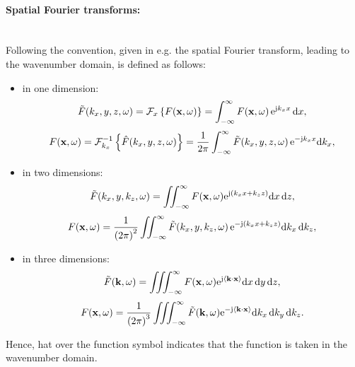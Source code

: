\paragraph{Spatial Fourier transforms:}\mbox{} \\
Following the convention, given in e.g. \cite{Ahrens2012} the spatial Fourier transform, leading to the wavenumber domain, is defined as follows:
\begin{itemize}
\item in one dimension:
\begin{equation}
\label{eq:spatial_fourier_transform_def}
\tilde{F}(k_x,y,z,\omega) = \mathcal{F}_x \left\{ F(\mathbf{x},\omega) \right\} = \int_ {-\infty}^{\infty} F(\mathbf{x},\omega) \, \mathrm{e}^{\mathrm{j} k_x x} \, \mathrm{d} x,
\end{equation}
\begin{equation}
\label{eq:spatial_inverse_fourier_transform_def}
F(\mathbf{x},\omega) = \mathcal{F}_{k_x}^{-1} \left\{ \hat{F}(k_x,y,z,\omega) \right\} = \frac{1}{2\pi} \int_ {-\infty}^{\infty} \tilde{F}(k_x,y,z,\omega) \, \mathrm{e}^{ -\mathrm{j} k_x x} \mathrm{d} k_x,
\end{equation}
\item in two dimensions:
\begin{equation}
\label{eq:spatial_fourier_transform_def_2d}
\tilde{F}(k_x,y,k_z,\omega) = \iint_ {-\infty}^{\infty} F(\mathbf{x},\omega) \mathrm{e}^{\mathrm{j} \left( k_x x + k_z z \right) } \mathrm{d} x \, \mathrm{d} z,
\end{equation}
\begin{equation}
\label{eq:spatial_inverse_fourier_transform_def_2d}
F(\mathbf{x},\omega) = \frac{1}{\left( 2\pi \right)^2} \iint_ {-\infty}^{\infty} \tilde{F}(k_x,y,k_z,\omega) \, \mathrm{e}^{ -\mathrm{j} \left( k_x x + k_z z \right)} \mathrm{d} k_x \, \mathrm{d} k_z,
\end{equation}
\item in three dimensions:
\begin{equation}
\label{eq:spatial_fourier_transform_def_3d}
\tilde{F}(\mathbf{k},\omega)= \iiint_ {-\infty}^{\infty} F(\mathbf{x},\omega) \mathrm{e}^{ \mathrm{j} \left< \mathbf{k} \cdot \mathbf{x} \right>} \mathrm{d} x \,\mathrm{d} y\,\mathrm{d} z,
\end{equation}
\begin{equation}
\label{eq:spatial_inverse_fourier_transform_def_3d}
F(\mathbf{x},\omega) = \frac{1}{\left( 2\pi \right)^3} \iiint_{-\infty}^{\infty} \tilde{F}(\mathbf{k},\omega) \mathrm{e}^{ -\mathrm{j} \left< \mathbf{k} \cdot \mathbf{x} \right>} \mathrm{d} k_x \, \mathrm{d} k_y \, \mathrm{d} k_z.
\end{equation}
\end{itemize}
Hence, hat over the function symbol indicates that the function is taken in the wavenumber domain.
